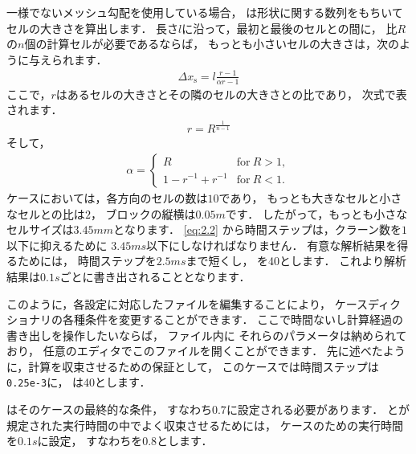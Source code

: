 一様でないメッシュ勾配を使用している場合，
%
%
は形状に関する数列をもちいてセルの大きさを算出します．
長さ$l$に沿って，最初と最後のセルとの間に，
比$R$の$n$個の計算セルが必要であるならば，
もっとも小さいセルの大きさは，次のように与えられます．
\begin{align}
 \label{eq:2.5}
  \Delta x_{\mathrm{s}} = l\frac{r - 1}{\alpha r - 1}
\end{align}
ここで，$r$はあるセルの大きさとその隣のセルの大きさとの比であり，
次式で表されます．
\begin{align}
 \label{eq:2.6}
  r = R^{\frac{1}{n-1}}
\end{align}
そして，
\begin{align}
 \label{eq:2.7}
  \alpha =
  \begin{cases}
   R & \text{for}\ R > 1, \\
   1 - r^{-1} + r^{-1} & \text{for}\ R < 1.
  \end{cases}
\end{align}
ケースにおいては，各方向のセルの数は$10$であり，
もっとも大きなセルと小さなセルとの比は$2$，
ブロックの縦横は$0.05\unit{m}$です．
したがって，もっとも小さなセルサイズは$3.45\unit{mm}$となります．
\autoref{eq:2.2} から時間ステップは，クラーン数を$1$以下に抑えるために
$3.45\unit{ms}$以下にしなければなりません．
有意な解析結果を得るためには，
時間ステップを$2.5\unit{ms}$まで短くし，
を40とします．
これより解析結果は$0.1\unit{s}$ごとに書き出されることとなります．

このように，各設定に対応したファイルを編集することにより，
ケースディクショナリの各種条件を変更することができます．
ここで時間ないし計算経過の書き出しを操作したいならば，
ファイル内に
それらのパラメータは納められており，
任意のエディタでこのファイルを開くことができます．
先に述べたように，計算を収束させるための保証として，
このケースでは時間ステップは\texttt{0.25e-3}に，
は40とします．

はそのケースの最終的な条件，
すなわち$0.7$に設定される必要があります．
とが規定された実行時間の中でよく収束させるためには，
ケースのための実行時間を$0.1\unit{s}$に設定，
すなわちを0.8とします．

